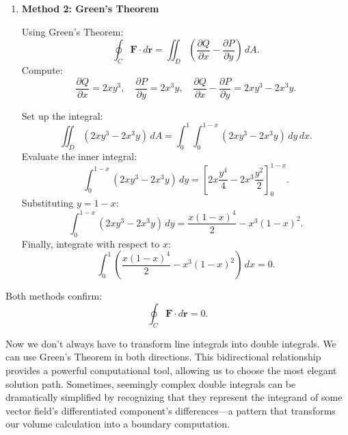 \begin{example}
\begin{solution}
\begin{enumerate}
\begin{enumerate}
\item \(C_3\): From \((0,1)\) to \((0,0)\)
Parameterize \(C_3\):
\[
\mathbf{r}_3(t) = (0, 1-t), \quad 0 \leq t \leq 1, \quad \frac{d\mathbf{r}_3}{dt} = (0, -1).
\]
Evaluate \(\mathbf{F} \cdot d\mathbf{r}\) along \(C_3\):
\[
\mathbf{F}(x,y) = (x^3y^2, x^2y^3), \quad \mathbf{F}(\mathbf{r}_3(t)) = (0^3(1-t)^2, 0^2(1-t)^3) = (0, 0).
\]
Thus:
\[
\int_{C_3} \mathbf{F} \cdot d\mathbf{r} = \int_0^1 (0)(0) + (0)(-1)\,dt = 0.
\]

The total line integral is:
\[
\oint_C \mathbf{F} \cdot d\mathbf{r} = \int_{C_1} \mathbf{F} \cdot d\mathbf{r} + \int_{C_2} \mathbf{F} \cdot d\mathbf{r} + \int_{C_3} \mathbf{F} \cdot d\mathbf{r} = 0 + 0 + 0 = 0.
\]
\end{enumerate}

\item \textbf{Method 2: Green's Theorem}

Using Green's Theorem:
\[
\oint_C \mathbf{F} \cdot d\mathbf{r} = \iint_D \left(\frac{\partial Q}{\partial x} - \frac{\partial P}{\partial y}\right)\,dA.
\]
Compute:
\[
\frac{\partial Q}{\partial x} = 2xy^3, \quad \frac{\partial P}{\partial y} = 2x^3y, \quad \frac{\partial Q}{\partial x} - \frac{\partial P}{\partial y} = 2xy^3 - 2x^3y.
\]

Set up the integral:
\[
\iint_D (2xy^3 - 2x^3y)\,dA = \int_0^1 \int_0^{1-x} (2xy^3 - 2x^3y)\,dy\,dx.
\]
Evaluate the inner integral:
\[
\int_0^{1-x} (2xy^3 - 2x^3y)\,dy = \left[2x\frac{y^4}{4} - 2x^3\frac{y^2}{2}\right]_0^{1-x}.
\]
Substituting \(y = 1-x\):
\[
\int_0^{1-x} (2xy^3 - 2x^3y)\,dy = \frac{x(1-x)^4}{2} - x^3(1-x)^2.
\]
Finally, integrate with respect to \(x\):
\[
\int_0^1 \left(\frac{x(1-x)^4}{2} - x^3(1-x)^2\right)\,dx = 0.
\]

\end{enumerate}

Both methods confirm:
\[
\oint_C \mathbf{F} \cdot d\mathbf{r} = 0.
\]
\end{solution}
\end{example}
\exampleline

\noindent \noindent Now we don't always have to transform line integrals into double integrals. We can use Green's Theorem in both directions. This bidirectional relationship provides a powerful computational tool, allowing us to choose the most elegant solution path. Sometimes, seemingly complex double integrals can be dramatically simplified by recognizing that they represent the integrand of some vector field's differentiated component's differences—a pattern that transforms our volume calculation into a boundary computation.

